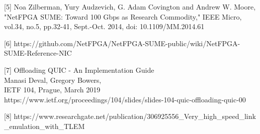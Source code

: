 \documentclass[a4paper,12pt]{article}
\begin{document}
[5]
Noa Zilberman, Yury Audzevich, G. Adam Covington and Andrew W. Moore,\\
"NetFPGA SUME: Toward 100 Gbps as Research Commodity," IEEE Micro,\\
vol.34, no.5, pp.32-41, Sept.-Oct. 2014, doi: 10.1109/MM.2014.61

[6]
https://github.com/NetFPGA/NetFPGA-SUME-public/wiki/NetFPGA-SUME-Reference-NIC

[7]
Offloading QUIC - An Implementation Guide\\
Manasi Deval, Gregory Bowers, \\
IETF 104, Prague, March 2019\\
https://www.ietf.org/proceedings/104/slides/slides-104-quic-offloading-quic-00

[8]
https://www.researchgate.net/publication/306925556\_Very\_high\_speed\_link   \_emulation\_with\_TLEM 
\end{document}
